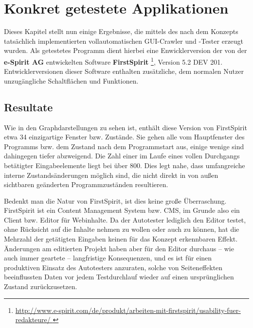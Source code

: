 \chapter{Konkret getestete Applikationen}\label{chapter:concretetests}


Dieses Kapitel stellt nun einige Ergebnisse, die mittels des nach dem Konzepts tatsächlich
implementierten vollautomatischen GUI-Crawler und -Tester erzeugt wurden.
Als getestetes Programm dient hierbei eine Enwicklerversion der von der
\textbf{e-Spirit AG} entwickelten Software \textbf{FirstSpirit} 
\footnote{\url{ http://www.e-spirit.com/de/produkt/arbeiten-mit-firstspirit/usability-fuer-redakteure/ }},
Version 5.2 DEV 201. Entwicklerversionen dieser Software enthalten zusätzliche,
dem normalen Nutzer unzugängliche Schaltflächen und Funktionen.


\section{Resultate}\label{section:testresults}


Wie in den Graphdarstellungen zu sehen ist, enthält diese Version von
FirstSpirit etwa 34 einzigartige Fenster bzw. Zustände. Sie gehen alle vom
Hauptfenster des Programms bzw. dem Zustand nach dem Programmstart aus,
einige wenige sind dahingegen tiefer abzweigend. Die Zahl einer im
Laufe eines vollen Durchgangs betätigter Eingabeelemente liegt bei
über 800. Dies legt nahe, dass umfangreiche interne Zustandsänderungen
möglich sind, die nicht direkt in von außen sichtbaren geänderten
Programmzuständen resultieren.

Bedenkt man die Natur von FirstSpirit, ist dies keine große Überraschung.
FirstSpirit ist ein Content Management System bzw. CMS, im Grunde also
ein Client bzw. Editor für Webinhalte. Da der Autotester lediglich den Editor testet,
ohne Rücksicht auf die Inhalte nehmen zu wollen oder auch zu können,
hat die Mehrzahl der getätigten Eingaben keinen für das Konzept erkennbaren
Effekt. Änderungen am editierten Projekt haben aber für den Editor durchaus
-- wie auch immer geartete -- langfristige Konsequenzen, und es ist für
einen produktiven Einsatz des Autotesters anzuraten, solche von Seiteneffekten
beeinflussten Daten vor jedem Testdurchlauf wieder auf einen ursprünglichen
Zustand zurückzusetzen.


